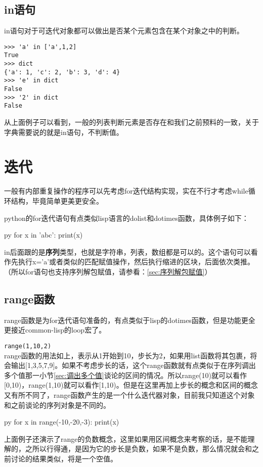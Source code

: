 \documentclass[12pt,oneside]{book}
\begin{document}
\begin{common-format}
\subsection{in语句}
in语句对于可迭代对象都可以做出是否某个元素包含在某个对象之中的判断。
\begin{Verbatim}
>>> 'a' in ['a',1,2]
True
>>> dict
{'a': 1, 'c': 2, 'b': 3, 'd': 4}
>>> 'e' in dict
False
>>> '2' in dict
False
\end{Verbatim}
从上面例子可以看到，一般的列表判断元素是否存在和我们之前预料的一致，关于字典需要说的就是in语句，不判断值。






\section{迭代}
一般有内部重复操作的程序可以先考虑for迭代结构实现，实在不行才考虑while循环结构，毕竟简单更美更安全。

python的for迭代语句有点类似lisp语言的dolist和dotimes函数，具体例子如下：
\begin{xverbatim}[129]{py}
for x in 'abc':
    print(x)
\end{xverbatim}
in后面跟的是\textbf{序列}类型，也就是字符串，列表，数组都是可以的。这个语句可以看作先执行x='a'或者类似的匹配赋值操作，然后执行缩进的区块，后面依次类推。（所以for语句也支持序列解包赋值，请参看：\ref{sec:序列解包赋值}）


\subsection{range函数}
range函数是为for迭代语句准备的，有点类似于lisp的dotimes函数，但是功能更全更接近common-lisp的loop宏了。

\verb+range(1,10,2)+\\
range函数的用法如上，表示从1开始到10，步长为2，如果用list函数将其包裹，将会输出[1,3,5,7,9]。如果不考虑步长的话，这个range函数就有点类似于在序列调出多个值那一小节\ref{sec:调出多个值}谈论的区间的情况。所以range(10)就可以看作[0,10)，range(1,10)就可以看作[1,10)。但是在这里再加上步长的概念和区间的概念又有所不同了，range函数产生的是一个什么迭代器对象，目前我只知道这个对象和之前谈论的序列对象是不同的。

\begin{xverbatim}[129]{py}
for x in range(-10,-20,-3):
    print(x)
\end{xverbatim}
上面例子还演示了range的负数概念，这里如果用区间概念来考察的话，是不能理解的，之所以行得通，是因为它的步长是负数，如果不是负数，那么情况就会和之前讨论的结果类似，将是一个空值。



\end{common-format}
\end{document}
